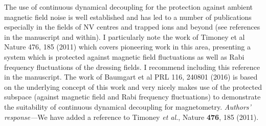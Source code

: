 \documentclass[letterpaper]{article}
\newenvironment{refcomment}{\singlespacing\verbatim}{\endverbatim}
\newcommand{\response}{\emph{Authors' response---}}
\begin{document}
\begin{refcomment}
The use of continuous dynamical decoupling for the protection against 
ambient magnetic field noise is well established and has led to a 
number of publications especially in the fields of NV centres and 
trapped ions and beyond (see references in the manuscript and within).
I particularly note the work of Timoney et al Nature 476, 185 (2011) 
which covers pioneering work in this area, presenting a system which 
is protected against magnetic field fluctuations as well as Rabi 
frequency fluctuations of the dressing fields. I recommend including 
this reference in the manuscript. The work of Baumgart et al PRL 116, 
240801 (2016) is based on the underlying concept of this work and very
nicely makes use of the protected subspace (against magnetic field and
Rabi frequency fluctuations) to demonstrate the suitability of 
continuous dynamical decoupling for magnetometry.
\end{refcomment}
\response We have added a reference to Timoney \textit{et al.}, Nature \textbf{476}, 185 (2011).
\end{document}
